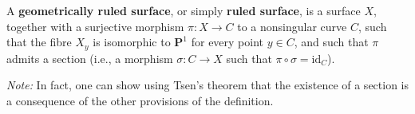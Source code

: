 A \textbf{geometrically ruled surface}, or simply \textbf{ruled surface}, is a surface $X$, together with a surjective morphism $\pi: X \rightarrow C$ to a nonsingular curve $C$, such that the fibre $X_y$ is isomorphic to $\mathbf{P}^1$ for every point $y \in C$, and such that $\pi$ admits a section (i.e., a morphism $\sigma: C \rightarrow X$ such that $\pi \circ \sigma = \text{id}_C$).

\textit{Note:} In fact, one can show using Tsen's theorem that the existence of a section is a consequence of the other provisions of the definition.
